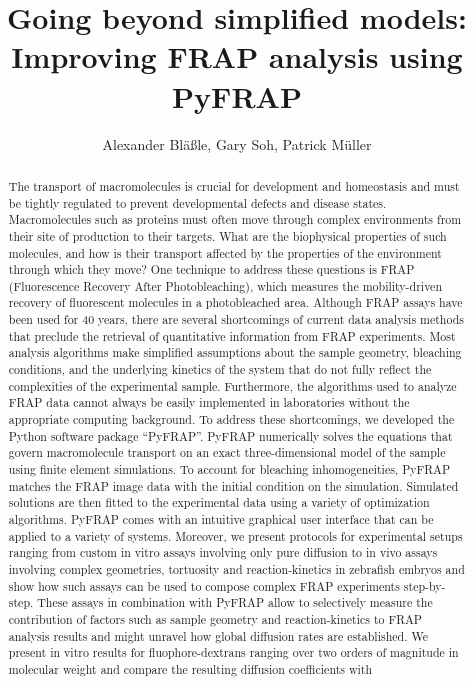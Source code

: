 \documentclass[a4paper,10pt,twocolumn]{article}
\title{Going beyond simplified models: Improving FRAP analysis using PyFRAP}
\author{Alexander Bl\"a\ss le, Gary Soh, Patrick M\"uller}
\begin{document}
\maketitle

\begin{abstract}
The transport of macromolecules is crucial for development and homeostasis and must be tightly regulated to prevent developmental defects and disease states. Macromolecules such as proteins must often move 
through complex environments from their site of production to their targets. What are the biophysical properties of such molecules, and how is their transport affected by the properties of the environment 
through which they move? One technique to address these questions is FRAP (Fluorescence Recovery After Photobleaching), which measures the mobility-driven recovery of fluorescent molecules in a photobleached 
area. Although FRAP assays have been used for 40 years, there are several shortcomings of current data analysis methods that preclude the retrieval of quantitative information from FRAP experiments. 
Most analysis algorithms make simplified assumptions about the sample geometry, bleaching conditions, and the underlying kinetics of the system that do not fully reflect the complexities of the experimental 
sample. Furthermore, the algorithms used to analyze FRAP data cannot always be easily implemented in laboratories without the appropriate computing background. To address these shortcomings, we developed the
Python software package “PyFRAP”. PyFRAP numerically solves the equations that govern macromolecule transport on an exact three-dimensional model of the sample using finite element simulations. To account for
bleaching inhomogeneities, PyFRAP matches the FRAP image data with the initial condition on the simulation. Simulated solutions are then fitted to the experimental data using a variety of optimization 
algorithms. PyFRAP comes with an intuitive graphical user interface that can be applied to a variety of systems. Moreover, we present protocols for experimental setups ranging from custom in vitro assays 
involving only pure diffusion to in vivo assays involving complex geometries, tortuosity and reaction-kinetics in zebrafish embryos  and show how such assays can be used to compose complex FRAP experiments 
step-by-step. These assays in combination with PyFRAP allow to selectively measure the contribution of factors such as sample geometry and reaction-kinetics to FRAP analysis results and might unravel how 
global diffusion rates are established. We present in vitro results for fluophore-dextrans ranging over two orders of magnitude in molecular weight and compare the resulting diffusion coefficients with

\end{abstract}
\end{document}
